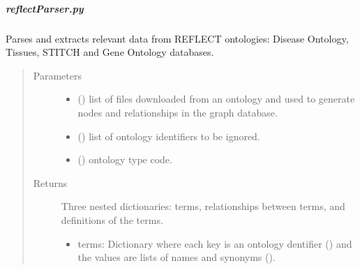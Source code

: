\documentclass[letterpaper,10pt,english]{sphinxmanual}
\begin{document}
\subparagraph{reflectParser.py}
\label{\detokenize{_autosummary/graphdb_builder.ontologies.parsers:module-graphdb_builder.ontologies.parsers.reflectParser}}\label{\detokenize{_autosummary/graphdb_builder.ontologies.parsers:reflectparser-py}}

\begin{fulllineitems}
\label{\detokenize{_autosummary/graphdb_builder.ontologies.parsers:graphdb_builder.ontologies.parsers.reflectParser.parser}}
Parses and extracts relevant data from REFLECT ontologies: Disease Ontology, Tissues, STITCH and     Gene Ontology databases.
\begin{quote}\begin{description}
\item[{Parameters}] \leavevmode\begin{itemize}
\item {} 
 () \textendash{} list of files downloaded from an ontology and used to generate nodes and relationships in the graph database.

\item {} 
 () \textendash{} list of ontology identifiers to be ignored.

\item {} 
 () \textendash{} ontology type code.

\end{itemize}

\item[{Returns}] \leavevmode

Three nested dictionaries: terms, relationships between terms, and definitions of the terms.
\begin{itemize}
\item {} 
terms: Dictionary where each key is an ontology dentifier () and the values are lists of names and synonyms ().


\end{itemize}
\end{description}
\end{quote}
\end{fulllineitems}
\end{document}
